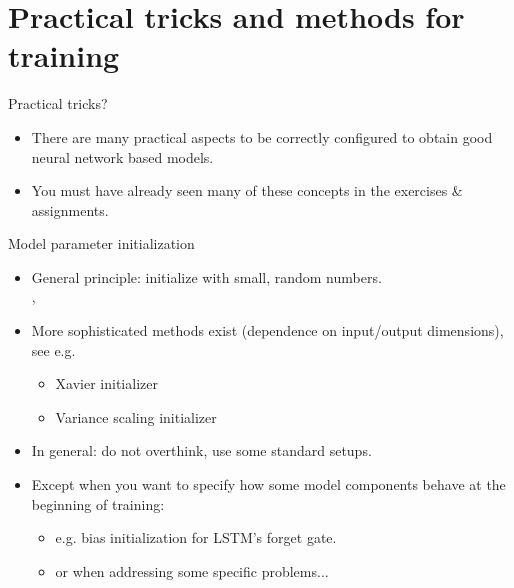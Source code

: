 \section{Practical tricks and methods for training}

\begin{frame}{Practical tricks?}
\begin{itemize}
\item There are many practical aspects to be correctly configured to obtain good neural network
based models.
\item You must have already seen many of these concepts in the exercises \& assignments.
\end{itemize}
\end{frame}

\begin{frame}{Model parameter initialization}
\begin{itemize}
\item General principle: initialize with small, random numbers.\\
, 
\item More sophisticated methods exist (dependence on input/output dimensions), see e.g.
\begin{itemize}
\item Xavier initializer 
\item Variance scaling initializer 
\end{itemize}
\vsp
\item In general: do not overthink, use some standard setups.
\item Except when you want to specify how some model components behave at the beginning of training:
\begin{itemize}
\item e.g. bias initialization for LSTM's forget gate.
\item or when addressing some specific problems...
\end{itemize}
\end{itemize}
\end{frame}

